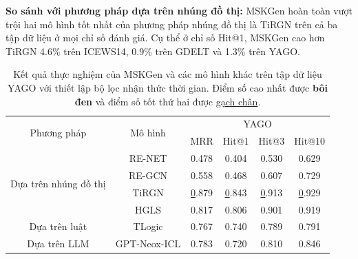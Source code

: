 \textbf{So sánh với phương pháp dựa trên nhúng đồ thị:} MSKGen hoàn toàn vượt trội hai mô hình tốt nhất của phương pháp nhúng đồ thị là TiRGN 
trên cả ba tập dữ liệu ở mọi chỉ số đánh giá. Cụ thể ở chỉ số Hit@1, MSKGen cao hơn TiRGN 4.6\% trên ICEWS14, 0.9\% trên GDELT và 1.3\% trên YAGO.

\begin{table}[H]
\caption{Kết quả thực nghiệm của MSKGen và các mô hình khác trên tập dữ liệu YAGO với thiết lập bộ lọc nhận thức thời gian. 
Điểm số cao nhất được \textbf{bôi đen} và điểm số tốt thứ hai được \underline{gạch chân}.}
\label{tab:table56}
\begin{adjustbox}{width=\textwidth}
\begin{tabular}{|cc|cccc|}
\hline
\multicolumn{1}{|c|}{\multirow{2}{*}{Phương pháp}}     & \multirow{2}{*}{Mô hình} & \multicolumn{4}{c|}{YAGO}                                                                           \\ \cline{3-6} 
\multicolumn{1}{|c|}{}                                 &                          & \multicolumn{1}{c|}{MRR} & \multicolumn{1}{c|}{Hit@1} & \multicolumn{1}{c|}{Hit@3} & Hit@10         \\ \hline
\multicolumn{1}{|c|}{\multirow{4}{*}{Dựa trên nhúng đồ thị}} & RE-NET                   & 0.478                    & 0.404                      & 0.530                      & 0.629          \\ \cline{2-2}
\multicolumn{1}{|c|}{}                                 & RE-GCN                   & 0.558                    & 0.468                      & 0.607                      & 0.729          \\ \cline{2-2}
\multicolumn{1}{|c|}{}                                 & TiRGN                    & {\ul 0.879}              & {\ul 0.843}                & {\ul 0.913}                & {\ul 0.929}    \\ \cline{2-2}
\multicolumn{1}{|c|}{}                                 & HGLS                     & 0.817                    & 0.806                      & 0.901                      & 0.919          \\ \hline
\multicolumn{1}{|c|}{Dựa trên luật}                    & TLogic                   & 0.767                    & 0.740                      & 0.789                      & 0.791          \\ \hline
\multicolumn{1}{|c|}{\multirow{3}{*}{Dựa trên LLM}}    & GPT-Neox-ICL             & 0.783                    & 0.720                      & 0.810                      & 0.846          \\ \cline{2-2}

\end{tabular}
\end{adjustbox}
\end{table}

